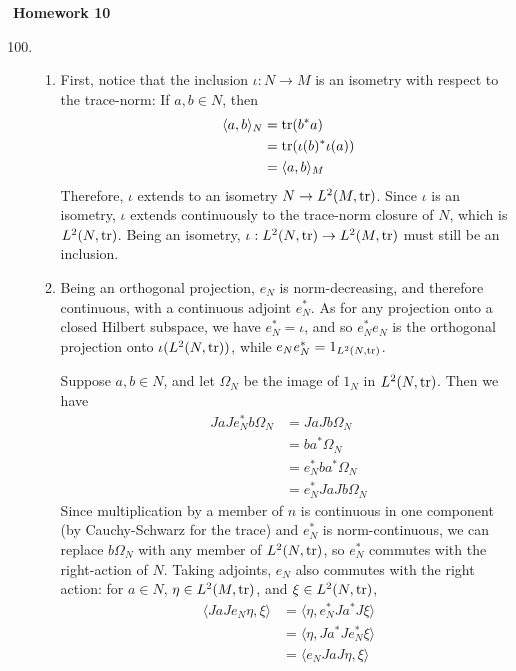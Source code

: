 \documentclass[a4paper,10pt]{report}
\newcommand{\ggen}[1]{\langle#1\rangle}
\begin{document}

\pagestyle{fancy}	
\fancyhf{} %
\setlength{\headheight}{60pt}

\begin{center}
	\textbf{Homework 10}
\end{center}

\begin{enumerate}
		\setcounter{enumi}{99}
	\item
		\begin{enumerate}
			\item First, notice that the inclusion $\iota:N\to M$ is an isometry with respect to the trace-norm: If $a,b\in N$, then 
				\begin{align*}
					\ggen{a,b}_N &= \tr(b^*a)\\
					&= \tr(\iota(b)^*\iota(a))\\
					&= \ggen{a,b}_M
				\end{align*}
				Therefore, $\iota$ extends to an isometry $N\to L^2(M,\operatorname{tr})$. Since $\iota$ is an isometry, $\iota$ extends continuously to the trace-norm closure of $N$, which is $L^2(N,\operatorname{tr})$. Being an isometry, $\iota:L^2(N,\operatorname{tr})\to L^2(M,\operatorname{tr})$ must still be an inclusion. 
			\item Being an orthogonal projection, $e_N$ is norm-decreasing, and therefore continuous, with a continuous adjoint $e_N^*$. As for any projection onto a closed Hilbert subspace, we have $e_N^*=\iota$, and so $e_N^*e_N$ is the orthogonal projection onto $\iota(L^2(N,\operatorname{tr}))$, while $e_Ne_N^*=1_{L^2(N,\operatorname{tr})}$. 

				Suppose $a,b\in N$, and let $\Omega_N$ be the image of $1_N$ in $L^2(N,\operatorname{tr})$. Then we have 
				\begin{align*}
						JaJe_N^*b\Omega_N &= JaJb\Omega_N\\
						&= ba^*\Omega_N\\
						&= e_N^*ba^*\Omega_N\\
						&= e_N^*JaJb\Omega_N
				\end{align*}
				Since multiplication by a member of $n$ is continuous in one component (by Cauchy-Schwarz for the trace) and $e_N^*$ is norm-continuous, we can replace $b\Omega_N$ with any member of $L^2(N,\operatorname{tr})$, so $e_N^*$ commutes with the right-action of $N$. 
				Taking 
				adjoints, $e_N$ also commutes with the right action: for $a\in N$, $\eta\in L^2(M,\operatorname{tr})$, and $\xi\in L^2(N,\operatorname{tr})$, 
				\begin{align*}
					\ggen{JaJe_N\eta,\xi} &= \ggen{\eta,e_N^*Ja^*J\xi}\\
					&= \ggen{\eta,Ja^*Je_N^*\xi}\\
					&= \ggen{e_NJaJ\eta,\xi}
				\end{align*}


\end{enumerate}
\end{enumerate}
\end{document}
